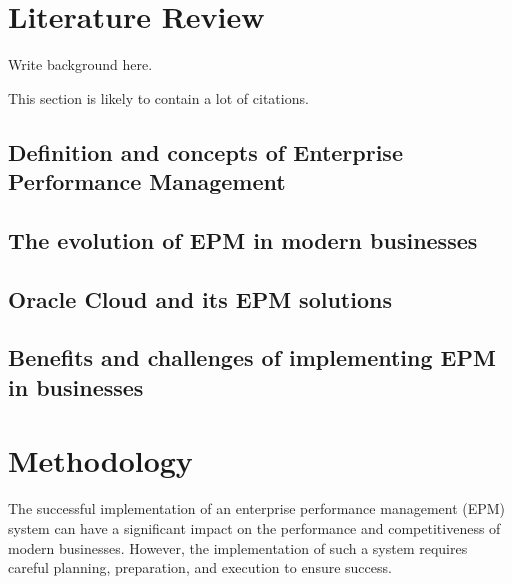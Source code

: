 \documentclass[12pt,a4paper,openright,twoside]{book}
\begin{document}
\chapter{Literature Review}
\label{chap:background}

Write background here.

This section is likely to contain a lot of citations.

\section{Definition and concepts of Enterprise Performance Management}

\section{The evolution of EPM in modern businesses}

\section{Oracle Cloud and its EPM solutions}

\section{Benefits and challenges of implementing EPM in businesses}

\chapter{Methodology}
\label{chap:design}


The successful implementation of an enterprise performance management (EPM) system can have a significant impact on the performance and competitiveness of modern businesses. 
%
However, the implementation of such a system requires careful planning, preparation, and execution to ensure success. 
\end{document}

